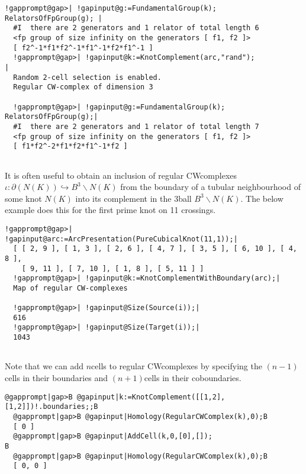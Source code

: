 \documentclass[a4paper,11pt]{report}
\begin{document}
{{\begin{Verbatim}[commandchars=!@|,fontsize=\small,frame=single,label=Example]
  !gapprompt@gap>| !gapinput@g:=FundamentalGroup(k); RelatorsOfFpGroup(g); |
  #I  there are 2 generators and 1 relator of total length 6
  <fp group of size infinity on the generators [ f1, f2 ]>
  [ f2^-1*f1*f2^-1*f1^-1*f2*f1^-1 ]
  !gapprompt@gap>| !gapinput@k:=KnotComplement(arc,"rand");               |
  Random 2-cell selection is enabled.
  Regular CW-complex of dimension 3
  
  !gapprompt@gap>| !gapinput@g:=FundamentalGroup(k); RelatorsOfFpGroup(g);|
  #I  there are 2 generators and 1 relator of total length 7
  <fp group of size infinity on the generators [ f1, f2 ]>
  [ f1*f2^-2*f1*f2*f1^-1*f2 ]
  
\end{Verbatim}
 It is often useful to obtain an inclusion of regular
CW\texttt{}complexes $\iota : \partial (N(K)) \hookrightarrow B^3 \backslash N(K)$ from the boundary of a tubular neighbourhood of some knot $N(K)$ into its complement in the $3$\texttt{}ball $B^3 \backslash N(K)$. The below example does this for the first prime knot on 11 crossings. 
\begin{Verbatim}[commandchars=!@|,fontsize=\small,frame=single,label=Example]
  !gapprompt@gap>| !gapinput@arc:=ArcPresentation(PureCubicalKnot(11,1));|
  [ [ 2, 9 ], [ 1, 3 ], [ 2, 6 ], [ 4, 7 ], [ 3, 5 ], [ 6, 10 ], [ 4, 8 ], 
    [ 9, 11 ], [ 7, 10 ], [ 1, 8 ], [ 5, 11 ] ]
  !gapprompt@gap>| !gapinput@k:=KnotComplementWithBoundary(arc);|
  Map of regular CW-complexes
  
  !gapprompt@gap>| !gapinput@Size(Source(i));|
  616
  !gapprompt@gap>| !gapinput@Size(Target(i));|
  1043
  
\end{Verbatim}
 Note that we can add $n$\texttt{}cells to regular CW\texttt{}complexes by
specifying the $(n-1)$\texttt{}cells in their boundaries and $(n+1)$\texttt{}cells in their coboundaries. 
\begin{Verbatim}[commandchars=@|B,fontsize=\small,frame=single,label=Example]
  @gapprompt|gap>B @gapinput|k:=KnotComplement([[1,2],[1,2]])!.boundaries;;B
  @gapprompt|gap>B @gapinput|Homology(RegularCWComplex(k),0);B
  [ 0 ]
  @gapprompt|gap>B @gapinput|AddCell(k,0,[0],[]);                          B
  @gapprompt|gap>B @gapinput|Homology(RegularCWComplex(k),0);B
  [ 0, 0 ]
  
\end{Verbatim}
 }

 
}
\end{document}
